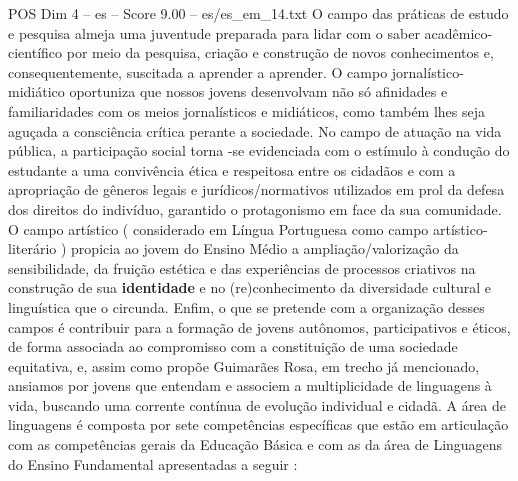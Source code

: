 \begin{textsample}{POS Dim 4 – es – Score 9.00 – es/es\_em\_14.txt}
O campo das práticas de estudo e pesquisa almeja uma juventude preparada para lidar com o saber acadêmico-científico por meio da pesquisa, criação e construção de novos conhecimentos e, consequentemente, suscitada a aprender a aprender.
O campo jornalístico-midiático oportuniza que nossos jovens desenvolvam não só afinidades e familiaridades com os meios jornalísticos e midiáticos, como também lhes seja aguçada a consciência crítica perante a sociedade.
No campo de atuação na vida pública, a participação social torna -se evidenciada com o estímulo à condução do estudante a uma convivência ética e respeitosa entre os cidadãos e com a apropriação de gêneros legais e jurídicos/normativos utilizados em prol da defesa dos direitos do indivíduo, garantido o protagonismo em face da sua comunidade.
O campo artístico ( considerado em Língua Portuguesa como campo artístico-literário ) propicia ao jovem do Ensino Médio a ampliação/valorização da sensibilidade, da fruição estética e das experiências de processos criativos na construção de sua \textbf{identidade} e no (re)conhecimento da diversidade cultural e linguística que o circunda.
Enfim, o que se pretende com a organização desses campos é contribuir para a formação de jovens autônomos, participativos e éticos, de forma associada ao compromisso com a constituição de uma sociedade equitativa, e, assim como propõe Guimarães Rosa, em trecho já mencionado, ansiamos por jovens que entendam e associem a multiplicidade de linguagens à vida, buscando uma corrente contínua de evolução individual e cidadã.
A área de linguagens é composta por sete competências específicas que estão em articulação com as competências gerais da Educação Básica e com as da área de Linguagens do Ensino Fundamental apresentadas a seguir :

\end{textsample}
